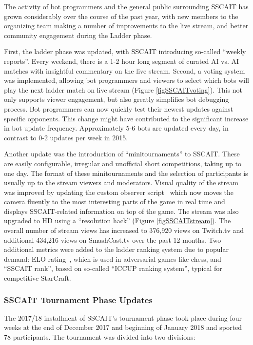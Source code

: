 The activity of bot programmers and the general public surrounding SSCAIT has grown considerably over the course of the past year, with new members to the organizing team making a number of improvements to the live stream, and better community engagement during the Ladder phase.

First, the ladder phase was updated, with SSCAIT introducing so-called ``weekly reports''. Every weekend, there is a 1-2 hour long segment of curated AI vs. AI matches with insightful commentary on the live stream. Second, a voting system was implemented, allowing bot programmers and viewers to select which bots will play the next ladder match on live stream (Figure \ref{figSSCAITvoting}). This not only supports viewer engagement, but also greatly simplifies bot debugging process. Bot programmers can now quickly test their newest updates against specific opponents. This change might have contributed to the significant increase in bot update frequency. Approximately 5-6 bots are updated every day, in contrast to 0-2 updates per week in 2015.

Another update was the introduction of ``minitournaments'' to SSCAIT. These are easily configurable, irregular and unofficial short competitions, taking up to one day. The format of these minitournaments and the selection of participants is usually up to the stream viewers and moderators. Visual quality of the stream was improved by updating the custom observer script~\cite{mattsson2015automatic} which now moves the camera fluently to the most interesting parts of the game in real time and displays SSCAIT-related information on top of the game. The stream was also upgraded to HD using a ``resolution hack'' (Figure \ref{figSSCAITstream}). 
The overall number of stream views has increased to 376,920 views on Twitch.tv and additional 434,216 views on SmashCast.tv over the past 12 months. Two additional metrics were added to the ladder ranking system due to popular demand: ELO rating~\cite{elo1978rating}, which is used in adversarial games like chess, and ``SSCAIT rank'', based on so-called ``ICCUP ranking system'', typical for competitive StarCraft.

\subsubsection*{SSCAIT Tournament Phase Updates}

The 2017/18 installment of SSCAIT's tournament phase took place during four weeks at the end of December 2017 and beginning of January 2018 and sported 78 participants. The tournament was divided into two divisions:

